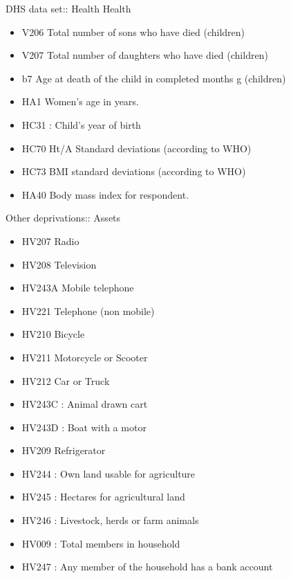 \documentclass[10pt]{beamer}
\begin{document}
  \begin{frame}{DHS data set:: Health}
      Health
\begin{itemize}
    \item V206  Total number of sons who have died (children)
\item V207  Total number of daughters who have died  (children)
\item b7  Age at death of the child in completed months g (children)
\item HA1 Women's age in years. 
\item  HC31 : Child's year of birth 
\item HC70 Ht/A Standard deviations (according to WHO) 
\item HC73 BMI standard deviations (according to WHO) 
\item  HA40 Body mass index for respondent.  

\end{itemize}

  \end{frame}
\begin{frame}{Other deprivations:: Assets}
\begin{itemize}
     \item   HV207 Radio
    \item   HV208  Television
     \item   HV243A  Mobile telephone
    \item   HV221  Telephone (non mobile)
     
          \item  HV210 Bicycle
     \item  HV211 Motorcycle or Scooter
    \item   HV212 Car or Truck
     \item   HV243C : Animal drawn cart
     \item   HV243D : Boat with a motor
     
     \item   HV209  Refrigerator
     \item  HV244 : Own land usable for agriculture
     \item   HV245 : Hectares for agricultural land
     \item   HV246 : Livestock, herds or farm animals

 \item HV009 : Total members in household
\item HV247 : Any member of the household has a bank account


\end{itemize}
\end{frame}
\end{document}
